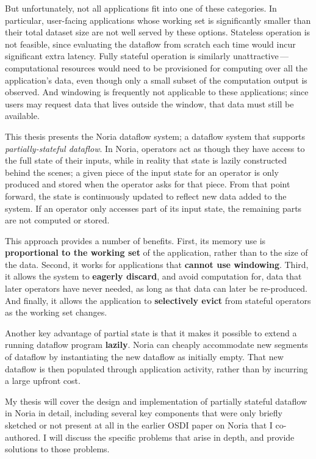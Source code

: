\documentclass[12pt,letterpaper,twoside]{article}
\begin{document}
But unfortunately, not all applications fit into one of these categories. In
particular, user-facing applications whose working set is significantly smaller
than their total dataset size are not well served by these options. Stateless
operation is not feasible, since evaluating the dataflow from scratch each time
would incur significant extra latency. Fully stateful operation is similarly
unattractive\,---\,computational resources would need to be provisioned for
computing over all the application's data, even though only a small subset of
the computation output is observed. And windowing is frequently not applicable
to these applications; since users may request data that lives outside the
window, that data must still be available.

This thesis presents the Noria dataflow system; a dataflow system that supports
\emph{partially-stateful dataflow}. In Noria, operators act as though they have
access to the full state of their inputs, while in reality that state is lazily
constructed behind the scenes; a given piece of the input state for an operator
is only produced and stored when the operator asks for that piece. From that
point forward, the state is continuously updated to reflect new data added to
the system. If an operator only accesses part of its input state, the remaining
parts are not computed or stored.

This approach provides a number of benefits. First, its memory use is
\textbf{proportional to the working set} of the application, rather than to the
size of the data. Second, it works for applications that \textbf{cannot use
windowing}. Third, it allows the system to \textbf{eagerly discard}, and avoid
computation for, data that later operators have never needed, as long as that
data can later be re-produced. And finally, it allows the application to
\textbf{selectively evict} from stateful operators as the working set changes.

Another key advantage of partial state is that it makes it possible to extend a
running dataflow program \textbf{lazily}. Noria can cheaply accommodate new
segments of dataflow by instantiating the new dataflow as initially empty. That
new dataflow is then populated through application activity, rather than by
incurring a large upfront cost.

My thesis will cover the design and implementation of partially stateful
dataflow in Noria in detail, including several key components that were only
briefly sketched or not present at all in the earlier OSDI paper on
Noria\cite{noria} that I co-authored. I will discuss the specific problems that
arise in depth, and provide solutions to those problems.
\end{document}
